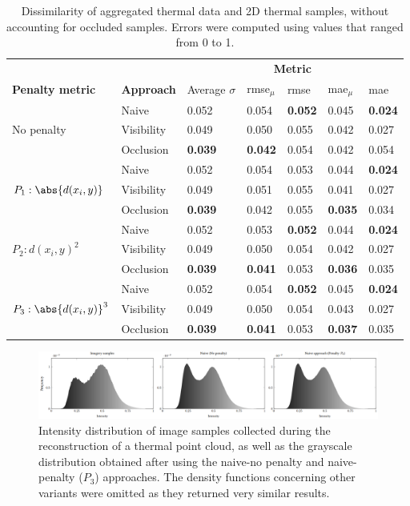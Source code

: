 \renewcommand{\arraystretch}{1.2}
\begin{table}[ht]
    \sffamily\footnotesize
    \caption{Dissimilarity of aggregated thermal data and 2D thermal samples, without accounting for occluded samples. Errors were computed using values that ranged from 0 to 1. }
    \label{table:thermal_error_dispersion}
    \begin{tabular}{@{}lllllll@{}}
    \toprule
    & & \multicolumn{5}{c}{\textbf{Metric}} \\
    \cmidrule{3-7}
    \textbf{Penalty metric} & \textbf{Approach} & Average $\sigma$ & \acrshort{rmse}$_{\mu}$ & \acrshort{rmse} & \acrshort{mae}$_{\mu}$ & \acrshort{mae}\\
    \midrule
    \multirow{3}{*}{No penalty} & Naive & 0.052 & 0.054 & \textbf{0.052} & 0.045 & \textbf{0.024}\\
    & Visibility & 0.049 & 0.050 & 0.055 & 0.042 & 0.027\\
    & Occlusion & \textbf{0.039} & \textbf{0.042} & 0.054 & 0.042 & 0.054\\
    \midrule
    \multirow{3}{*}{$P_1 : \abs{d(x_i, y)}$} & Naive & 0.052 & 0.054 & 0.053 & 0.044 & \textbf{0.024} \\
    & Visibility & 0.049 & 0.051 & 0.055 & 0.041 & 0.027 \\
    & Occlusion & \textbf{0.039} & 0.042 & 0.055 & \textbf{0.035} & 0.034\\
    \midrule
    \multirow{3}{*}{$P_2 : d(x_i, y)^2$} & Naive & 0.052 & 0.053 & \textbf{0.052} & 0.044 & \textbf{0.024} \\
    & Visibility & 0.049 & 0.050 & 0.054 & 0.042 & 0.027 \\
    & Occlusion & \textbf{0.039} & \textbf{0.041} & 0.053 & \textbf{0.036} & 0.035\\
    \midrule
    \multirow{3}{*}{$P_3 : \abs{d(x_i, y)}^3$} & Naive & 0.052 & 0.054 & \textbf{0.052} & 0.045 & \textbf{0.024} \\
    & Visibility & 0.049 & 0.050 & 0.054 & 0.043 & 0.027 \\
    & Occlusion & \textbf{0.039} & \textbf{0.041} & 0.053 & \textbf{0.037} & 0.035 \\
    \bottomrule
    \end{tabular}
    \normalsize
\end{table}
\renewcommand{\arraystretch}{1}

\begin{figure}
    \centering
    \includegraphics[width=\linewidth]{figs/thermal_projection/density_function.png}
	\caption{Intensity distribution of image samples collected during the reconstruction of a thermal point cloud, as well as the grayscale distribution obtained after using the naive-no penalty and naive-penalty ($P_3$) approaches. The density functions concerning other variants were omitted as they returned very similar results.}
	\label{fig:thermal_histogram_results}
\end{figure}

